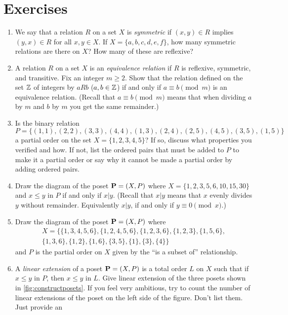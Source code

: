 \section{Exercises}

\begin{enumerate}
\item We say that a relation $R$ on a set $X$ is \textit{symmetric} if
  $(x,y)\in R$ implies $(y,x)\in R$ for all $x,y\in X$. If
  $X=\{a,b,c,d,e,f\}$, how many symmetric relations are there on $X$?
  How many of these are reflexive?
\item A relation $R$ on a set $X$ is an \textit{equivalence relation}
  if $R$ is reflexive, symmetric, and transitive. Fix an integer
  $m\geq 2$. Show that the relation defined on the set
  $\mathbb{Z}$ of integers by $aRb$ ($a,b\in\mathbb{Z}$) if and only if $a\equiv
  b\pmod{m}$ is an equivalence relation. (Recall that $a\equiv
  b\pmod{m}$ means that when dividing $a$ by $m$ and $b$ by $m$ you
  get the same remainder.)
\item Is the binary relation \[P=\{(1,1),(2,2),(3,3),(4,4),(1,3),(2,4),(2,5),(4,5),(3,5),(1,5)\}\] a partial
  order on the set $X=\{1,2,3,4,5\}$? If so, discuss what properties
  you verified and how. If not, list the ordered pairs that must be
  added to $P$ to make it a partial order or say why it cannot be made
  a partial order by adding ordered pairs.
\item Draw the diagram of the poset $\mathbf{P}=(X,P)$ where
  $X=\{1,2,3,5,6,10,15,30\}$ and $x\leq y$ in $P$ if and only if
  $x|y$. (Recall that $x|y$ means that $x$ evenly divides $y$ without
  remainder. Equivalently $x|y$, if and only if $y\equiv
  0\pmod{x}$.) \label{exer:posets:division}
\item Draw the diagram of the poset $\mathbf{P}=(X,P)$ where
 \begin{multline*}
    X=\{\{1,3,4,5,6\},\{1,2,4,5,6\},\{1,2,3,6\},\{1,2,3\},\{1,5,6\},\\\{1,3,6\},\{1,2\},\{1,6\},\{3,5\},\{1\},\{3\},\{4\}\}
  \end{multline*}
 and $P$ is the partial order on $X$ given by the ``is a subset of''
 relationship.
\item A \textit{linear extension} of a poset $\mathbf{P}=(X,P)$ is a total
  order $L$ on $X$ such that if $x\leq y$ in $P$, then $x\leq y$ in $L$. Give 
  linear extension of the three posets shown in \autoref{fig:constructposets}.
  If you feel very ambitious, try to count the number of linear extensions of
  the poset on the left side of the figure.  Don't list them.  Just provide an

\end{enumerate}
